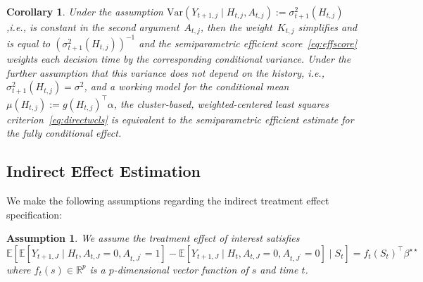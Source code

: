 \documentclass[12pt]{article}
\def\E{\mathbb{E}}
\newtheorem{cor}[thm]{Corollary}
\newtheorem{assumption}[thm]{Assumption}
\begin{document}
\begin{cor}
\label{cor:semiparametricconnection}
Under the assumption $\text{Var}(Y_{t+1,j} \mid H_{t,j}, A_{t,j}) := \sigma^2_{t+1}(H_{t,j})$,i.e., is constant in the second argument~$A_{t,j}$, then the weight~$K_{t,j}$ simplifies and is equal to $(\sigma^2_{t+1}(H_{t,j}))^{-1}$ and the semiparametric efficient score~\eqref{eq:effscore} weights each decision time by the corresponding conditional variance.  Under the further assumption that this variance does not depend on the history, i.e., $\sigma^2_{t+1} (H_{t,j}) = \sigma^2$, and a working model for the conditional mean $\mu (H_{t,j}) := g (H_{t,j})^\top \alpha$, the cluster-based, weighted-centered least squares criterion~\eqref{eq:directwcls} is equivalent to the semiparametric efficient estimate for the fully conditional effect.
\end{cor}

\subsection{Indirect Effect Estimation}
\label{section:indirect}

We make the following assumptions regarding the indirect treatment effect specification:

\begin{assumption} \normalfont
\label{ass:indirecteffect}
We assume the treatment effect of interest satisfies
$$
\E \left[ \E \left[ Y_{t+1, J} \mid H_t, A_{t,J} = 0, A_{t,J^\prime} = 1 \right] - \E \left[ Y_{t+1, J} \mid H_t, A_{t,J} = 0, A_{t,J^\prime} = 0 \right] \mid S_t \right] = f_t (S_t)^\top \beta^{\star \star}
$$
where $f_t (s) \in \mathbb{R}^p$ is a $p$-dimensional vector function of $s$ and time $t$.
\end{assumption}
\end{document}
